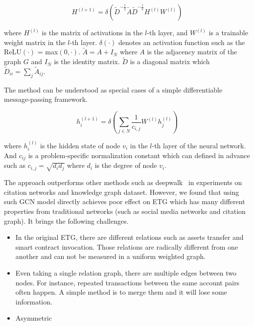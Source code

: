 \begin{equation}
H^{(l+1)}=\delta(\tilde{D}^{-\frac{1}{2}}\tilde{A}\tilde{D}^{-\frac{1}{2}}H^{(l)}W^{(l)})
\label{eq1}
\end{equation}

where $H^{(l)}$ is the matrix of activations in the $l$-th layer, and $W^{(l)}$ is a trainable weight matrix in the $l$-th layer. $\delta(\cdot)$ denotes an activation function such as the ReLU$(\cdot)$ = max$(0,\cdot)$. $\tilde{A}=A+I_N$ where $A$ is the adjacency matrix of the graph $G$ and $I_N$ is the identity matrix. $\tilde{D}$ is a diagonal matrix which $\tilde{D}_{ii}=\sum_{j}\tilde{A}_{ij}$.

 The method can be understood as special cases of a simple differentiable message-passing framework.

\begin{equation}
h_i^{(l+1)}=\delta(\sum_{j \in N} \frac{1}{c_{i,j}}W^{(l)}h_j^{(l)})
\label{eq:gcn}
\end{equation}

where $h_i^{(l)}$ is the hidden state of node $v_i$ in the $l$-th layer of the neural network. And $c_{ij}$ is a problem-specific normalization constant which can defined in advance such as $c_{i,j}=\sqrt{d_i d_j}$ where $d_i$ is the degree of node $v_i$.

The approach outperforms other methods such as deepwalk~\cite{perozzi2014deepwalk} in experiments on citation networks and knowledge graph dataset. However, we found that using such GCN model directly achieves poor effect on ETG which has many different properties from traditional networks (such as social media networks and citation graph). It brings the following challenges.

\begin{itemize}
\item In the original ETG, there are different relations such as assets transfer and smart contract invocation. Those relations are radically different from one another and can not be measured in a uniform weighted graph.
\item Even taking a single relation graph, there are multiple edges between two nodes. For instance, repeated transactions between the same account pairs often happen. A simple method is to merge them and it will lose some information.
\item Asymmetric
\end{itemize}

